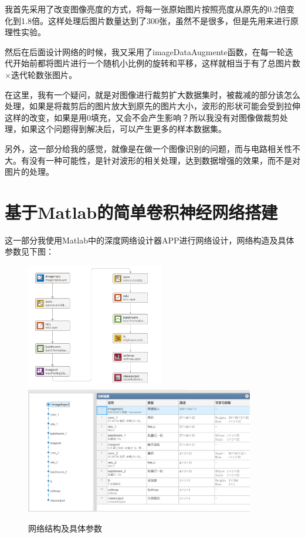 \documentclass{article}
\begin{document}
	我首先采用了改变图像亮度的方式，将每一张原始图片按照亮度从原先的0.2倍变化到1.8倍。这样处理后图片数量达到了300张，虽然不是很多，但是先用来进行原理性实验。
	
	然后在后面设计网络的时候，我又采用了imageDataAugmente函数，在每一轮迭代开始前都将图片进行一个随机小比例的旋转和平移，这样就相当于有了总图片数$\times$迭代轮数张图片。
	
	在这里，我有一个疑问，就是对图像进行裁剪扩大数据集时，被裁减的部分该怎么处理，如果是将裁剪后的图片放大到原先的图片大小，波形的形状可能会受到拉伸这样的改变，如果是用0填充，又会不会产生影响？所以我没有对图像做裁剪处理，如果这个问题得到解决后，可以产生更多的样本数据集。
	
	另外，这一部分给我的感觉，就像是在做一个图像识别的问题，而与电路相关性不大。有没有一种可能性，是针对波形的相关处理，达到数据增强的效果，而不是对图片的处理。
	
	\section{基于Matlab的简单卷积神经网络搭建}
	
	这一部分我使用Matlab中的深度网络设计器APP进行网络设计，网络构造及具体参数见下图：
	
	\begin{figure}[htbp]
		\centering
		\includegraphics[width=6cm]{figure/net.png}
		\quad
		\includegraphics[width=10cm]{figure/net1.png}
		\caption{网络结构及具体参数}
	\end{figure}
\end{document}
